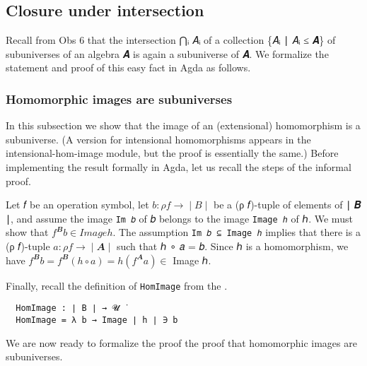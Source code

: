\documentclass[a4paper,USenglish,cleveref,autoref,thm-restate]{lipics-v2019}
\begin{document}
\subsection{Closure under intersection}\label{closure-under-intersection}
Recall from Obs 6 that the intersection ⋂ᵢ 𝐴ᵢ of a collection \{𝐴ᵢ ∣ 𝐴ᵢ ≤ 𝑨\} of subuniverses of an algebra 𝑨 is
again a subuniverse of 𝑨. We formalize the statement and proof of this easy fact in Agda as follows.
\begin{code}\end{code}

\subsubsection{Homomorphic images are subuniverses}\label{homomorphic-images-are-subuniverses}
In this subsection we show that the image of an (extensional)
homomorphism is a subuniverse. (A version for intensional homomorphisms
appears in the intensional-hom-image module, but the proof is
essentially the same.) Before implementing the result formally in Agda,
let us recall the steps of the informal proof.

Let 𝑓 be an operation symbol, let \(b : ρ f → ∣ B ∣\) be a (ρ 𝑓)-tuple
of elements of ∣ 𝑩 ∣, and assume the image \texttt{Im\ 𝑏} of 𝑏 belongs
to the image \texttt{Image\ ℎ} of ℎ. We must show that
\(f^𝑩 b ∈ Image h\). The assumption \texttt{Im\ 𝑏\ ⊆\ Image\ ℎ} implies
that there is a (ρ 𝑓)-tuple \(𝑎 : ρ f → ∣ 𝑨 ∣\) such that ℎ ∘ 𝑎 = 𝑏.
Since ℎ is a homomorphism, we have
\(f^𝑩 𝑏  = f^𝑩 (ℎ ∘ 𝑎) = ℎ (f^𝑨 𝑎) ∈\) Image ℎ.

Finally, recall the definition of \texttt{HomImage} from the \homsmodule.
\begin{verbatim}
  HomImage : ∣ B ∣ → 𝓤 ̇
  HomImage = λ b → Image ∣ h ∣ ∋ b
\end{verbatim}
We are now ready to formalize the proof the proof that homomorphic images are subuniverses.
\begin{code}\end{code}
\end{document}
